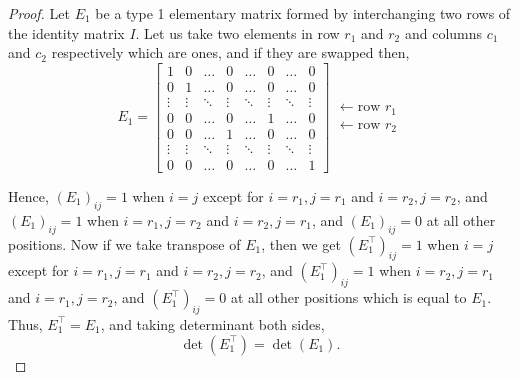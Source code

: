 \documentclass[12pt, a4paper]{article}
\theoremstyle{definition}
\theoremstyle{remark}
\begin{document}
        \begin{proof}
        Let $E_1$ be a type 1 elementary matrix formed by interchanging two rows of the identity matrix $I$. Let us take two elements in row $r_1$ and $r_2$ and columns $c_1$ and $c_2$ respectively which are ones, and if they are swapped then,
        \[
        E_1 = \begin{bmatrix}
        1 & 0 & \dots & 0 & \dots & 0 & \dots & 0 \\
        0 & 1 & \dots & 0 & \dots & 0 & \dots & 0 \\
        \vdots & \vdots & \ddots & \vdots & \ddots & \vdots & \ddots & \vdots \\
        0 & 0 & \dots & 0 & \dots & 1 & \dots & 0 \\
        0 & 0 & \dots & 1 & \dots & 0 & \dots & 0 \\
        \vdots & \vdots & \ddots & \vdots & \ddots & \vdots & \ddots & \vdots  \\
        0 & 0 & \dots & 0 & \dots & 0 & \dots & 1
        \end{bmatrix}
        \begin{array}{l}
        \\
        \\
        \\
        \leftarrow \text{row } r_1 \\
        \leftarrow \text{row } r_2 \\
        \\
        \\
        \end{array}
        \]

        Hence, $(E_1)_{ij} = 1$ when $i=j$ except for $i=r_1, j=r_1$ and $i=r_2, j=r_2$, and $(E_1)_{ij} = 1$ when $i=r_1, j=r_2$ and $i=r_2, j=r_1$, and $(E_1)_{ij} = 0$ at all other positions. Now if we take transpose of $E_1$, then we get $(E_1^\top)_{ij} = 1$ when $i=j$ except for $i=r_1, j=r_1$ and $i=r_2, j=r_2$, and $(E_1^\top)_{ij} = 1$ when $i=r_2, j=r_1$ and $i=r_1, j=r_2$, and $(E_1^\top)_{ij} = 0$ at all other positions which is equal to $E_1$. Thus, $E_1^\top = E_1$, and taking determinant both sides,
        \[
        \det(E_1^\top) = \det(E_1).
        \]


\end{proof}
\end{document}
